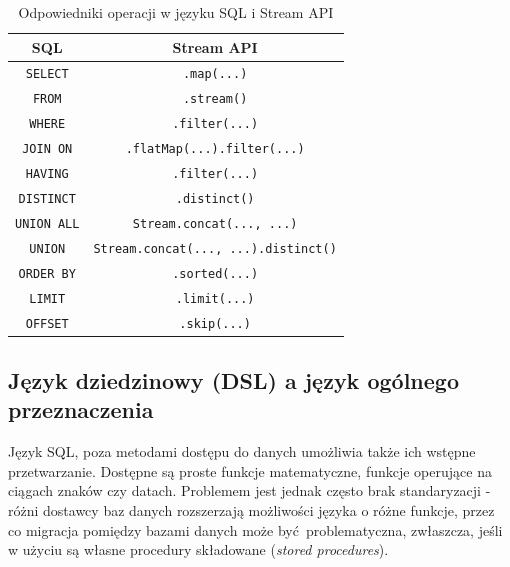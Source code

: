 \documentclass[12pt,twoside,openright]{extarticle}
\begin{document}
\begin{table}[t]
    \label{nazwa odnośnika, która potem użyjemy do cytowania tabeli}
    \begin{center}
        \begin{tabular}{ |c|c| }
            \hline
            SQL & Stream API \\
            \hline
            \texttt{SELECT} & \texttt{.map(...)}  \\
            \texttt{FROM} & \texttt{.stream()}  \\
            \texttt{WHERE} & \texttt{.filter(...)}  \\
            \texttt{JOIN ON} & \texttt{.flatMap(...).filter(...)}  \\
            \texttt{HAVING} & \texttt{.filter(...)}  \\
            \hline
            \texttt{DISTINCT} & \texttt{.distinct()}  \\ 
            \texttt{UNION ALL} & \texttt{Stream.concat(..., ...)} \\
            \texttt{UNION} & \texttt{Stream.concat(..., ...).distinct()}  \\
            \hline
            \texttt{ORDER BY} & \texttt{.sorted(...)}  \\
            \texttt{LIMIT} & \texttt{.limit(...)}  \\
            \texttt{OFFSET} & \texttt{.skip(...)}  \\
            \hline
        \end{tabular}

        \caption{Odpowiedniki operacji w języku SQL i Stream API}
    \end{center}
\end{table}

\subsection{Język dziedzinowy (DSL) a język ogólnego przeznaczenia}

    Język SQL, poza metodami dostępu do danych umożliwia także ich wstępne przetwarzanie. Dostępne są proste funkcje matematyczne, funkcje operujące na ciągach znaków czy datach. Problemem jest jednak często brak standaryzacji - różni dostawcy baz danych rozszerzają możliwości języka o różne funkcje, przez co migracja pomiędzy bazami danych może być problematyczna, zwłaszcza, jeśli w użyciu są własne procedury składowane (\textit{stored procedures}). 
   
\end{document}
